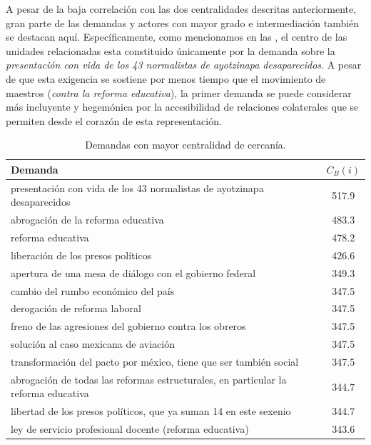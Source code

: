 \documentclass[letterpaper, 11pt]{book}
\theoremstyle{definition}
\theoremstyle{remark}
\begin{document}
A pesar de la baja correlación con las dos centralidades descritas anteriormente, gran parte de las demandas y actores con mayor grado e intermediación también se destacan aquí. 
Específicamente, como mencionamos en las , el centro de las unidades relacionadas esta constituido únicamente por la demanda sobre la \emph{presentación con vida de los 43 normalistas de ayotzinapa desaparecidos}. 
A pesar de que esta exigencia se sostiene por menos tiempo que el movimiento de maestros (\emph{contra la reforma educativa}), la primer demanda se puede considerar más incluyente y hegemónica por la accesibilidad de relaciones colaterales que se permiten desde el corazón de esta representación. 


\begin{table}[!hbt]
\center
\scriptsize
\caption{Demandas con mayor centralidad de cercanía.}
\label{Demandas_con_mayor_CC}
\begin{tabular}{ | l | c | } 
\hline
\hspace{19em} \textbf{Demanda} & \textbf{$C_{B}(i)$}\\
\hline
[a favor] presentación con vida de los 43 normalistas de ayotzinapa desaparecidos & 517.9\\ \hline
[a favor] abrogación de la reforma educativa & 483.3\\ \hline
[en contra] reforma educativa & 478.2\\ \hline
[a favor] liberación de los presos políticos & 426.6\\ \hline
[a favor] apertura de una mesa de diálogo con el gobierno federal & 349.3\\ \hline
[a favor] cambio del rumbo económico del país & 347.5\\ \hline
[a favor] derogación de reforma laboral & 347.5\\ \hline
[a favor] freno de las agresiones del gobierno contra los obreros & 347.5\\ \hline
[a favor] solución al caso mexicana de aviación & 347.5\\ \hline
[a favor] transformación del pacto por méxico, tiene que ser también social & 347.5\\ \hline
[a favor] abrogación de todas las reformas estructurales, en particular la reforma educativa & 344.7\\ \hline
[a favor] libertad de los presos políticos, que ya suman 14 en este sexenio & 344.7\\ \hline
[en contra] ley de servicio profesional docente (reforma educativa) & 343.6\\ \hline

\end{tabular}
\end{table}
\end{document}
